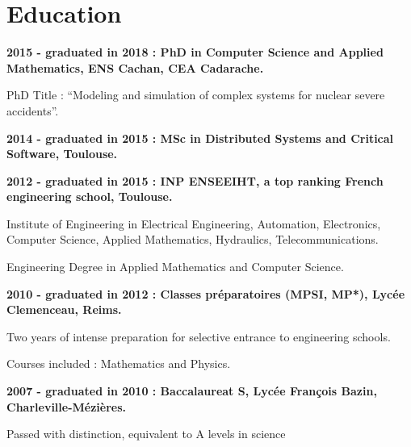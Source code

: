\documentclass{article}
\renewenvironment{itemize}{
  \begin{list}{}{
      \setlength{\leftmargin}{1.5em}
      \setlength{\itemsep}{0.25em}
      \setlength{\parskip}{0pt}
      \setlength{\parsep}{0.25em}
    }
}{
  \end{list}
}
\begin{document}
\section*{Education}
\begin{itemize}
  	\item \textbf{2015 - graduated in 2018 : PhD in Computer Science and Applied Mathematics, ENS Cachan, CEA Cadarache.}
		\begin{itemize}
			\item PhD Title : ``Modeling and simulation of complex systems for nuclear severe accidents''.
		\end{itemize}
	\item \textbf{2014 - graduated in 2015 : MSc in Distributed Systems and Critical Software, Toulouse.}
    	\item \textbf{2012 - graduated in 2015 : INP ENSEEIHT, a top ranking French engineering school, Toulouse.}
		\begin{itemize}
			\item Institute of Engineering in Electrical Engineering, Automation, Electronics, Computer Science, Applied Mathematics, Hydraulics, Telecommunications.
			\item Engineering Degree in Applied Mathematics and Computer Science.
		\end{itemize}
	\item \textbf{2010 - graduated in 2012 : Classes préparatoires (MPSI, MP*), Lycée Clemenceau, Reims.}
		\begin{itemize}
			\item Two years of intense preparation for selective entrance to engineering schools.
			\item Courses included : Mathematics and Physics.
		\end{itemize}
	\item \textbf{2007 - graduated in 2010 : Baccalaureat S, Lycée François Bazin, Charleville-Mézières.}
		\begin{itemize}
			\item Passed with distinction, equivalent to A levels in science
		\end{itemize}
\end{itemize}
\end{document}
